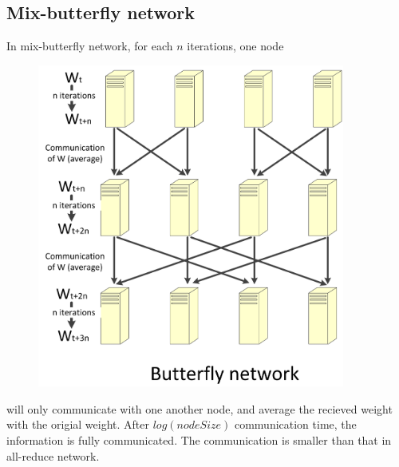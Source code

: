 \documentclass[landscape,final,archE1,fontscale=0.35]{baposter}
\begin{document}
\begin{poster}
{\subsection*{Mix-butterfly network}
In mix-butterfly network, for each $n$ iterations, one node
\begin{figure}
  \vspace{-70pt}
  \begin{center}
    \includegraphics[width=0.9\textwidth]{butterfly.jpg}
  \end{center}
  \vspace{-20pt}
  
  \vspace{-10pt}
\end{figure}
 will only communicate with one another node, and average the recieved weight with the origial weight. After $log(nodeSize)$ communication time, the information is fully communicated. The communication is smaller than that in all-reduce network.

}
\end{poster}
\end{document}
